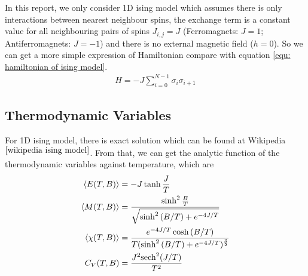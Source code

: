 \documentclass[12pt]{article}
\begin{document}
	In this report, we only consider 1D ising model which assumes there is only interactions between nearest neighbour spins, the exchange term is a constant value for all neighbouring pairs of spins $J_{i,j}=J$ (Ferromagnets: $J=1$; Antiferromagnets: $J=-1$) and there is no external magnetic field ($h=0$). So we can get a more simple expression of Hamiltonian compare with equation \ref{equ: hamiltonian of ising model}.
	\begin{align}
		H=-J\sum_{i=0}^{N-1} \sigma_i \sigma_{i+1}
	\end{align}
	
	\subsection{Thermodynamic Variables}
	\label{sec； thermodynamic variables}
	
	For 1D ising model, there is exact solution which can be found at Wikipedia $^{\cite{wikipedia ising model}}$. From that, we can get the analytic function of the thermodynamic variables against temperature, which are 
	\begin{align}\label{equ: analytic solution of variables}
		\nonumber \braket{E(T,B)}&=-J \tanh{\frac{J}{T}}\\
		\nonumber \braket{M(T,B)}&=\frac{\sinh^2{\frac{B}{T}}}{\sqrt{\sinh^2{(B/T)}+e^{-4J/T}}}\\
		\nonumber \braket{\chi(T,B)}&=\frac{e^{-4J/T} \cosh{(B/T)}}{T (\sinh^2{(B/T)}+e^{-4J/T})^\frac{3}{2}}\\
		\nonumber C_V(T,B)&=\frac{J^2 \text{sech}^2{(J/T)}}{T^2}
	\end{align}
	
\end{document}
